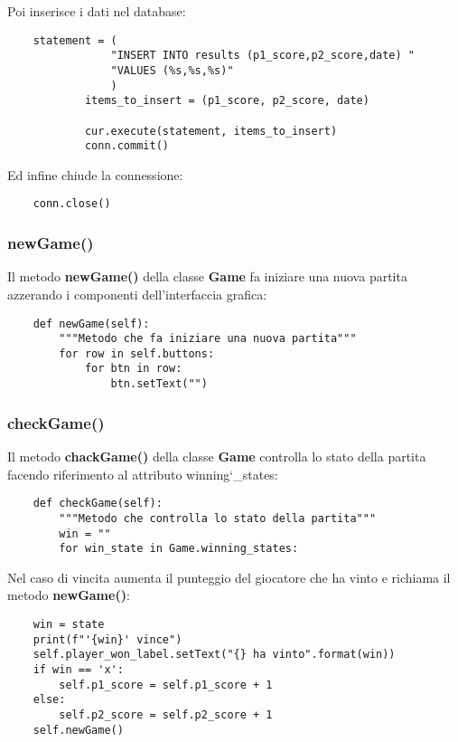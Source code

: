 \documentclass{article}
\begin{document}
Poi inserisce i dati nel database:

\begin{verbatim}
    statement = (
                "INSERT INTO results (p1_score,p2_score,date) "
                "VALUES (%s,%s,%s)"
                )
            items_to_insert = (p1_score, p2_score, date)

            cur.execute(statement, items_to_insert)
            conn.commit() 
\end{verbatim}

Ed infine chiude la connessione:

\begin{verbatim}
    conn.close()
\end{verbatim}
\newpage

\subsubsection{newGame()}
Il metodo \textbf{newGame()} della classe \textbf{Game} fa iniziare una nuova partita azzerando i componenti dell'interfaccia grafica:

\begin{verbatim}
    def newGame(self):
        """Metodo che fa iniziare una nuova partita"""
        for row in self.buttons:
            for btn in row:
                btn.setText("")
\end{verbatim}

\subsubsection{checkGame()}
Il metodo \textbf{chackGame()} della classe \textbf{Game} controlla lo stato della partita facendo riferimento al attributo winning\char`_states:

\begin{verbatim}
    def checkGame(self):
        """Metodo che controlla lo stato della partita"""
        win = ""
        for win_state in Game.winning_states:
\end{verbatim}

Nel caso di vincita aumenta il punteggio del giocatore che ha vinto e richiama il metodo \textbf{newGame()}:

\begin{verbatim}
    win = state
    print(f"'{win}' vince")
    self.player_won_label.setText("{} ha vinto".format(win))
    if win == 'x':
        self.p1_score = self.p1_score + 1
    else:
        self.p2_score = self.p2_score + 1
    self.newGame()
\end{verbatim}
\end{document}
